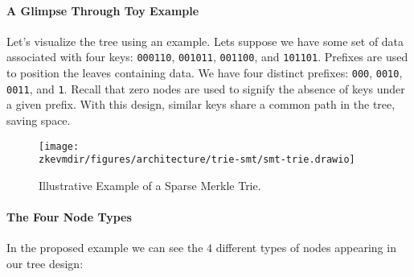 \paragraph*{A Glimpse Through Toy Example}

Let's visualize the tree using an example. Lets suppose we have some set of data associated with four keys: \texttt{000110}, \texttt{001011}, \texttt{001100}, and \texttt{101101}. Prefixes are used to position the leaves containing data. We have four distinct prefixes: \texttt{000}, \texttt{0010}, \texttt{0011}, and \texttt{1}. Recall that zero nodes are used to signify the absence of keys under a given prefix. With this design, similar keys share a common path in the tree, saving space.

\begin{figure}[H]
\centering
\texttt{[image: \\zkevmdir/figures/architecture/trie-smt/smt-trie.drawio]}
\caption{Illustrative Example of a Sparse Merkle Trie.}
\end{figure}

\paragraph*{The Four Node Types} In the proposed example we can see the $4$ different types of nodes appearing in our tree design:

